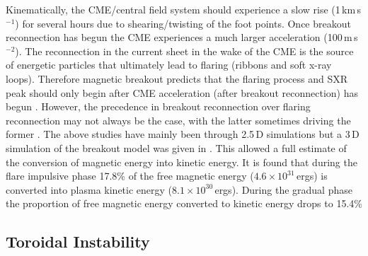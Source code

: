 Kinematically, the CME/central field system should experience a slow rise (1\,km\,s$^{-1}$) for several hours due to shearing/twisting of the foot points. Once breakout reconnection has begun the CME experiences a much larger acceleration (100\,m\,s$^{-2}$). The reconnection in the current sheet in the wake of the CME is the source of energetic particles that ultimately lead to flaring (ribbons and soft x-ray loops). Therefore magnetic breakout predicts that the flaring process and SXR peak should only begin after CME acceleration (after breakout reconnection) has begun \citep{lynch2004}. However, the precedence in breakout reconnection over flaring reconnection may not always be the case, with the latter sometimes driving the former \citep{macneice2004}. The above studies have mainly been through 2.5\,D simulations but a 3\,D simulation of the breakout model was given in \citet{lynch2008}. This allowed a full estimate of the conversion of magnetic energy into kinetic energy. It is found that during the flare impulsive phase 17.8\% of the free magnetic energy ($4.6\times10^{31}$\,ergs) is converted into plasma kinetic energy ($8.1\times10^{30}$\,ergs). During the gradual phase the proportion of free magnetic energy converted to kinetic energy drops to 15.4\%


\subsection{Toroidal Instability}\label{sec:ti_model}

